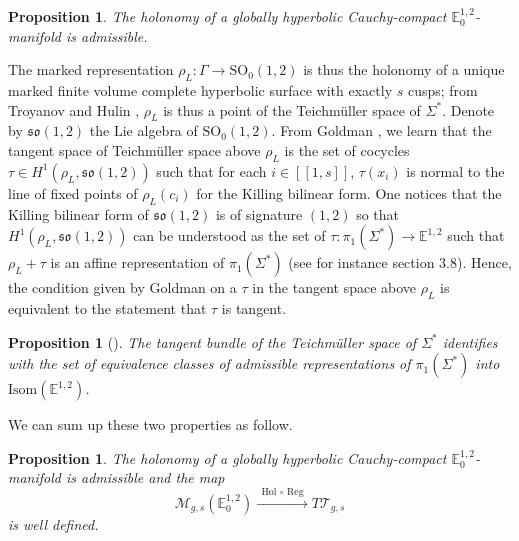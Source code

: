 \documentclass[a4paper,12pt]{article}
\def\M{\mathcal{M}}
\def\GG{\SO_0(1,2)}
\def\isom{Isom}
\def\lsem{[\![}
\def\rsem{]\!]}
\def\T{\mathcal{T}}
\def\SO{\mathrm{SO}}
\newcommand{\mass}[1]{{\mathbb E}^{1,2}_{#1}}
\def\isom{\mathrm{Isom}}
\def\Reg{\mathrm{Reg}}
\newtheorem{propou}[lemou]{Proposition}
\begin{document}
 \begin{propou}\label{btzprop:holonomy_globally_hyperbolic_cauchy_compact}  
The holonomy of a globally hyperbolic Cauchy-compact $\mass{0}$-mani\-fold is admissible.
 \end{propou}
 
 
 
  The marked representation $\rho_L : \Gamma\rightarrow \GG$ is thus the holonomy of a unique marked finite volume complete hyperbolic surface with exactly $s$ cusps; from Troyanov and Hulin \cite{MR1166122}, $\rho_L$ is thus a point of the Teichmüller space of $\Sigma^*$.
Denote by $\mathfrak{so}(1,2)$  the Lie algebra of $\mathrm{SO}_0(1,2)$.
From Goldman \cite{MR762512}, we learn that the tangent space  of Teichmüller space above $\rho_L$ is the set of cocycles $\tau\in H^1(\rho_L,\mathfrak{so}(1,2))$ 
such that for each $i\in \lsem 1,s\rsem$, $\tau(x_i)$ is normal to the line of fixed points of $\rho_L(c_i)$ for the Killing bilinear form.
 One notices  that the Killing bilinear form of $\mathfrak{so}(1,2)$ is of signature $(1,2)$ so that $H^1(\rho_L,\mathfrak{so}(1,2))$ can be understood as the set of $\tau:
 \pi_1(\Sigma^*)\rightarrow \mass{}$ such that $\rho_L+\tau$ is an affine representation  of $\pi_1(\Sigma^*)$ (see for instance \cite{MR2499272} section 3.8). Hence, the condition given by Goldman on a $\tau$ in the tangent space above $\rho_L$  is equivalent to the statement that $\tau$ is tangent. 

\begin{propou}[\cite{MR762512,MR1166122}]\label{btzprop:mr_mr}
 The tangent bundle of the Teichmüller space of $\Sigma^*$ identifies with the set of equivalence classes of admissible representations of $\pi_1(\Sigma^*)$ into $\isom(\mass{})$.
\end{propou} 

We can sum up these two properties as follow.

\begin{propou}\label{btzprop:hol_map}  \label{prop:hol_map}
The holonomy of a globally hyperbolic Cauchy-compact $\mass{0}$-manifold is admissible and
 the map 
$$ \M_{g,s}(\mass{0})\xrightarrow{~~\mathrm{Hol}\,\circ\, \Reg~~} T\T_{g,s}$$ is well defined.
\end{propou}
\end{document}
